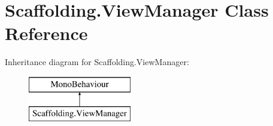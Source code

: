 \hypertarget{class_scaffolding_1_1_view_manager}{\section{Scaffolding.\-View\-Manager Class Reference}
\label{class_scaffolding_1_1_view_manager}
}
Inheritance diagram for Scaffolding.\-View\-Manager\-:\begin{figure}[H]
\begin{center}
\leavevmode
\includegraphics[height=2.000000cm]{class_scaffolding_1_1_view_manager}
\end{center}
\end{figure}
